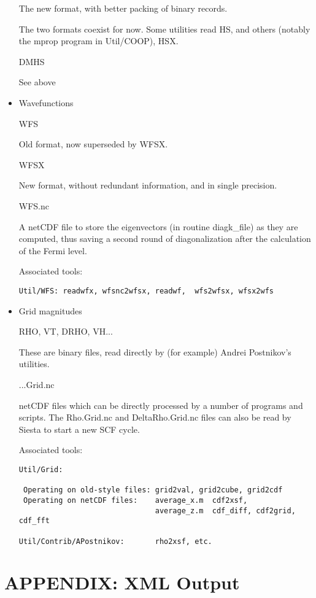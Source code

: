 \documentclass[11pt]{article}
\begin{document}
\begin{itemize}
The new format, with better packing of binary records.

The two formats coexist for now. Some utilities read HS, and others
(notably the mprop program in Util/COOP), HSX.

DMHS

See above

\item{Wavefunctions}

WFS

Old format, now superseded by WFSX.

WFSX

New format, without redundant information, and in single precision.

WFS.nc

A netCDF file to store the eigenvectors (in routine diagk\_file) as they
are computed, thus saving a second round of diagonalization after the
calculation of the Fermi level.

Associated tools:
\begin{verbatim}
Util/WFS: readwfx, wfsnc2wfsx, readwf,  wfs2wfsx, wfsx2wfs
\end{verbatim}

\item{Grid magnitudes}

RHO, VT, DRHO, VH...

These are binary files, read directly by (for example) Andrei
Postnikov's utilities.

...Grid.nc 

netCDF files which can be directly processed by a number of programs
and scripts.  The Rho.Grid.nc and DeltaRho.Grid.nc files can also be
read by Siesta to start a new SCF cycle.

Associated tools:

\begin{verbatim}
Util/Grid:   

 Operating on old-style files: grid2val, grid2cube, grid2cdf
 Operating on netCDF files:    average_x.m	cdf2xsf, 
                               average_z.m  cdf_diff, cdf2grid, cdf_fft

Util/Contrib/APostnikov:       rho2xsf, etc.

\end{verbatim}
\end{itemize}

\newpage
\section{APPENDIX: XML Output}
\end{document}
